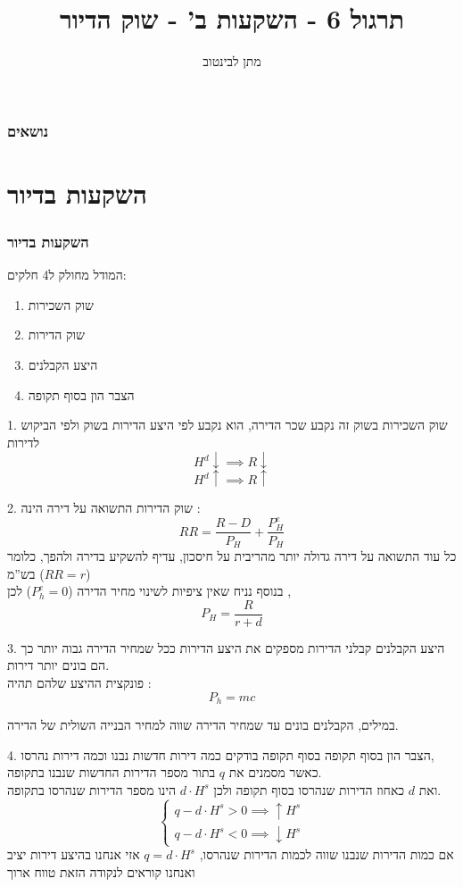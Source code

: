 \documentclass[usenames,dvipsnames]{beamer}
\title{תרגול 6 - השקעות ב' - שוק הדיור}
\author{\texthebrew{ מתן לבינטוב}}
\institute[{{ אב"ג}}]{{ אוניברסיטת בן גוריון בנגב}}
\date{}
\begin{document}
\begin{RTL}
\begin{frame}
\titlepage
\end{frame}

\begin{frame}
    \frametitle{נושאים}
    \tableofcontents
\end{frame}

\section{השקעות בדיור}
\begin{frame}[allowframebreaks]
    \frametitle{השקעות בדיור}
המודל מחולק ל4 חלקים: 
\begin{enumerate}
    \item שוק השכירות
    \item שוק הדירות
    \item היצע הקבלנים
    \item הצבר הון בסוף תקופה
\end{enumerate}
    
\framebreak

\begin{block}{1. שוק השכירות}
    בשוק זה נקבע שכר הדירה, הוא נקבע לפי היצע הדירות בשוק ולפי הביקוש לדירות
    $$ H^d \downarrow \implies R \downarrow $$
    $$ H^d \uparrow \implies R \uparrow $$
\end{block}
\framebreak
\begin{block}{2. שוק הדירות}
    התשואה על דירה הינה :
    $$ RR = \frac{R - D }{P_H} + \frac{P_H^{e}}{P_H} $$
    כל עוד התשואה על דירה גדולה יותר מהריבית על חיסכון, עדיף להשקיע בדירה ולהפך, כלומר בש''מ ($RR = r$)
    \\
     בנוסף נניח שאין ציפיות לשינוי מחיר הדירה ($P_h^e = 0 $)
    לכן ,
    $$P_H = \frac{R}{r+d}$$
\end{block}
\framebreak
\begin{block}{3. היצע הקבלנים}
    קבלני הדירות מספקים את היצע הדירות ככל שמחיר הדירה גבוה יותר כך הם בונים יותר דירות.
    \\
    פונקצית ההיצע שלהם תהיה :
    $$P_h = mc $$

    במילים, הקבלנים בונים עד שמחיר הדירה שווה למחיר הבנייה השולית של הדירה.
    
\end{block}

\framebreak
\begin{block}{4. הצבר הון בסוף תקופה}
    בסוף תקופה בודקים כמה דירות חדשות נבנו וכמה דירות נהרסו, \\ 
    כאשר מסמנים את $q$ בתור מספר הדירות החדשות שנבנו בתקופה.\\
    ואת $d$ כאחוז הדירות שנהרסו בסוף תקופה ולכן $d \cdot H^s$ הינו מספר הדירות שנהרסו בתקופה.
    $$\begin{cases}
        q - d \cdot H^s > 0 \implies \uparrow H^s \\
        q - d \cdot H^s < 0 \implies \downarrow H^s   
    \end{cases}$$
    אם כמות הדירות שנבנו שווה לכמות הדירות שנהרסו, $q = d\cdot H^s$ אזי אנחנו בהיצע דירות יציב ואנחנו קוראים לנקודה הזאת טווח ארוך
\end{block}


\end{frame}
\end{RTL}
\end{document}

